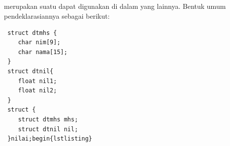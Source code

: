 \documentclass[../main.tex]{subfiles}
\begin{document}
    \subsection{{\Nested} {\Struct}}
    {\Nested} {\struct} merupakan suatu {\struct} dapat digunakan di dalam {\struct} yang lainnya. Bentuk umum pendeklarasiannya sebagai berikut:

\begin{lstlisting}
 struct dtmhs {
 	char nim[9];
 	char nama[15];
 }
 struct dtnil{
 	float nil1;
 	float nil2;
 }
 struct {
 	struct dtmhs mhs;
 	struct dtnil nil;
 }nilai;begin{lstlisting}
\end{lstlisting}
\end{document}

